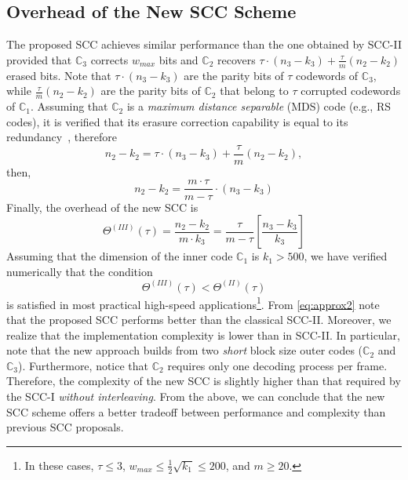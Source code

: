 \documentclass[conference]{IEEEtran}
\newcommand{\C}{\mathbb{C}}  %
\begin{document}
\subsection{Overhead of the New SCC Scheme} \label{sec:performance_proposed_scheme}

The proposed SCC achieves similar performance than the one obtained by
SCC-II provided that $\C_3$ corrects $w_{max}$ bits and $\C_2$
recovers $\tau\cdot(n_3-k_3) + \frac{\tau}{m}(n_2-k_2)$ erased
bits. Note that $\tau\cdot(n_3-k_3)$ are the parity bits of $\tau$
codewords of $\C_3$, while $\frac{\tau}{m}(n_2-k_2)$ are the parity
bits of $\C_2$ that belong to $\tau$ corrupted codewords of
$\C_1$. Assuming that $\C_2$ is a \textit{maximum distance separable}
(MDS) code (e.g., RS codes), it is verified that its erasure
correction capability is equal to its redundancy~\cite{HP2003},
therefore
\begin{equation}
  n_2-k_2=\tau\cdot(n_3-k_3) + \frac{\tau}{m}(n_2-k_2),
\end{equation}
then,
\begin{equation}
  n_2-k_2 = \frac{m\cdot \tau}{m-\tau}\cdot(n_3-k_3)
\end{equation}
Finally, the overhead of the new SCC is
\begin{equation}
  \Theta^{(I\!I\!I)}(\tau) = \frac{n_2-k_2}{m\cdot k_3} = \frac{\tau}{m-\tau}\left[\frac{n_3-k_3}{k_3}\right]
\end{equation}
Assuming that the dimension of the inner code $\C_1$ is $k_1>500$, we
have verified numerically that the condition 
\begin{equation}\label{eq:approx2}
 \Theta^{(I\!I\!I)}(\tau) < \Theta^{(I\!I)}(\tau)
\end{equation}
is satisfied in most practical high-speed applications\footnote{In
  these cases, $\tau\leq 3$, $w_{max}\leq \frac{1}{2}\sqrt{k_1} \leq
  200$, and $ m \ge 20$.}.  From \eqref{eq:approx2} note that the
proposed SCC performs better than the classical SCC-II. Moreover, we
realize that the implementation complexity is lower than in SCC-II. In
particular, note that the new approach builds from two \emph{short}
block size outer codes ($\C_2$ and $\C_3$). Furthermore, notice that
$\C_2$ requires only one decoding process per frame. Therefore, the
complexity of the new SCC is slightly higher than that required by the
SCC-I \emph{without interleaving}. From the above, we can conclude
that the new SCC scheme offers a better tradeoff between performance
and complexity than previous SCC proposals.
\end{document}
